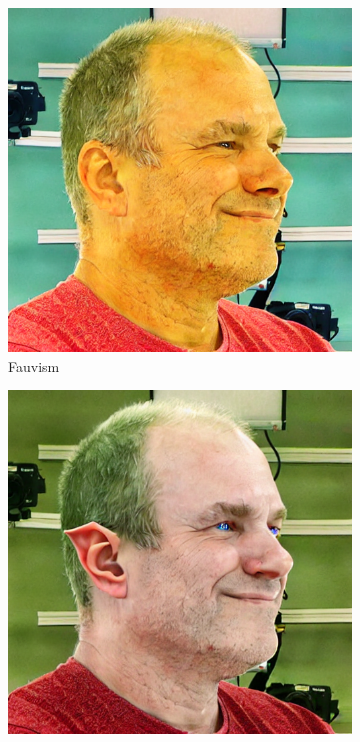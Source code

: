 \begin{figure}[ht]
\begin{subfigure}{0.18\linewidth}
        \includegraphics[width=\textwidth]{Figures/naive/low_cfg/ipix2pix_sven_fauvism/0-4-5-1-5648_230239_266.png}
        \caption{Fauvism}
	\end{subfigure}
    \begin{subfigure}{0.18\linewidth}
        \includegraphics[width=\textwidth]{Figures/naive/default/ipix2pix_sven_elf/0-4-5-1-5648_230239_266.png}

\end{subfigure}
\end{figure}
